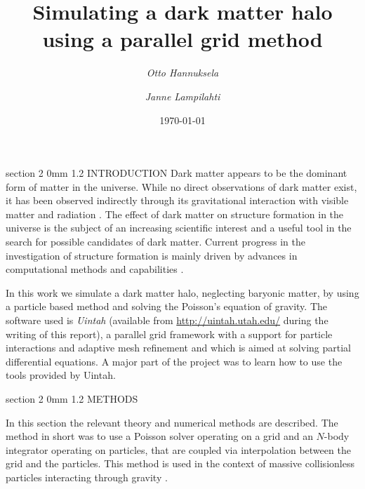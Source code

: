 \documentclass[notitlepage, 12pt]{article}
\title{Simulating a dark matter halo using a parallel grid method}
\author{{\em Otto Hannuksela} \and {\em Janne Lampilahti}}
\date{\today}
\makeatletter
\renewcommand{\section}{\@startsection       %
        {section}
        {2}
        {0mm}
        {1.2\baselineskip}
        {\baselineskip}
        {\centering\normalsize}}
\makeatother
\begin{document}
\maketitle
\section{INTRODUCTION}
Dark matter appears to be the dominant form of matter in the universe. While no direct observations of dark matter exist, it has been observed indirectly through its gravitational interaction with visible matter and radiation \citep{Roos2010}. The effect of dark matter on structure formation in the universe is the subject of an increasing scientific interest and a useful tool in the search for possible candidates of dark matter. Current progress in the investigation of structure formation is mainly driven by advances in computational methods and capabilities \citep{Kuhlen2012}. 

In this work we simulate a dark matter halo, neglecting baryonic matter, by using a particle based method and solving the Poisson's equation of gravity. The software used is {\em Uintah} (available from \url{http://uintah.utah.edu/} during the writing of this report), a parallel grid framework with a support for particle interactions and adaptive mesh refinement and which is aimed at solving partial differential equations. A major part of the project was to learn how to use the tools provided by Uintah.

\section{METHODS}

In this section the relevant theory and numerical methods are described. The method in short was to use a Poisson solver operating on a grid and an $N$-body integrator operating on particles, that are coupled via interpolation between the grid and the particles. This method is used in the context of massive collisionless particles interacting through gravity \citep[e.g.][]{Hockney1985}.  

\end{document}
